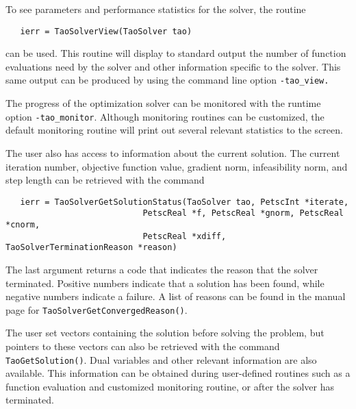 To see parameters and performance statistics for the solver, the
routine
\begin{verbatim}
   ierr = TaoSolverView(TaoSolver tao)
\end{verbatim}
can be used.  This routine will display to standard output the number
of function evaluations need by the solver and other information
specific to the solver.  This same output can be produced by using the 
command line option \tt{-tao\_view}.

The progress of the optimization solver can be monitored with
the runtime option {\tt -tao\_monitor}.  Although monitoring routines
can be customized, the default monitoring routine will print out 
several relevant statistics to the screen.

The user also has access to information about the current solution.
The current iteration number, objective function value, gradient
norm, infeasibility norm, and step length 
can be retrieved with the command 
\begin{verbatim}
   ierr = TaoSolverGetSolutionStatus(TaoSolver tao, PetscInt *iterate, 
                            PetscReal *f, PetscReal *gnorm, PetscReal *cnorm,
                            PetscReal *xdiff, TaoSolverTerminationReason *reason)
\end{verbatim}
\noindent
The last argument returns
a code that indicates the reason that the solver terminated.  Positive 
numbers indicate that a solution has been found, while negative numbers
indicate a failure.  A list of reasons can be found in the manual page
for {\tt TaoSolverGetConvergedReason()}.

The user set
vectors containing the solution before solving
the problem, but pointers to these vectors can also be retrieved with the
command {\tt TaoGetSolution()}.
Dual variables and other relevant information are also available. 
This information can be obtained during
user-defined routines such as a function evaluation and customized
monitoring routine, or after the solver has terminated.

